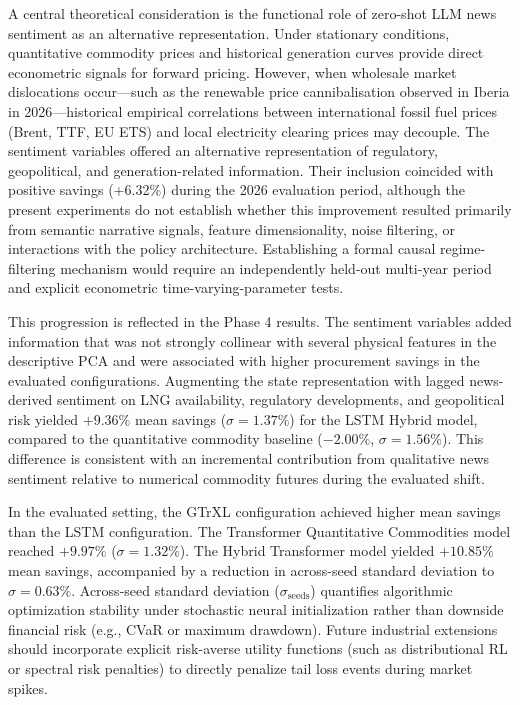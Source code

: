 A central theoretical consideration is the functional role of zero-shot LLM news sentiment as an alternative representation. Under stationary conditions, quantitative commodity prices and historical generation curves provide direct econometric signals for forward pricing. However, when wholesale market dislocations occur---such as the renewable price cannibalisation observed in Iberia in 2026---historical empirical correlations between international fossil fuel prices (Brent, TTF, EU ETS) and local electricity clearing prices may decouple. The sentiment variables offered an alternative representation of regulatory, geopolitical, and generation-related information. Their inclusion coincided with positive savings (+6.32\%) during the 2026 evaluation period, although the present experiments do not establish whether this improvement resulted primarily from semantic narrative signals, feature dimensionality, noise filtering, or interactions with the policy architecture. Establishing a formal causal regime-filtering mechanism would require an independently held-out multi-year period and explicit econometric time-varying-parameter tests.

This progression is reflected in the Phase 4 results. The sentiment variables added information that was not strongly collinear with several physical features in the descriptive PCA and were associated with higher procurement savings in the evaluated configurations. Augmenting the state representation with lagged news-derived sentiment on LNG availability, regulatory developments, and geopolitical risk yielded $+9.36\%$ mean savings ($\sigma=1.37\%$) for the LSTM Hybrid model, compared to the quantitative commodity baseline ($-2.00\%$, $\sigma=1.56\%$). This difference is consistent with an incremental contribution from qualitative news sentiment relative to numerical commodity futures during the evaluated shift.

In the evaluated setting, the GTrXL configuration achieved higher mean savings than the LSTM configuration. The Transformer Quantitative Commodities model reached $+9.97\%$ ($\sigma=1.32\%$). The Hybrid Transformer model yielded $+10.85\%$ mean savings, accompanied by a reduction in across-seed standard deviation to $\sigma=0.63\%$. Across-seed standard deviation ($\sigma_{\text{seeds}}$) quantifies algorithmic optimization stability under stochastic neural initialization rather than downside financial risk (e.g., CVaR or maximum drawdown). Future industrial extensions should incorporate explicit risk-averse utility functions (such as distributional RL or spectral risk penalties) to directly penalize tail loss events during market spikes.

